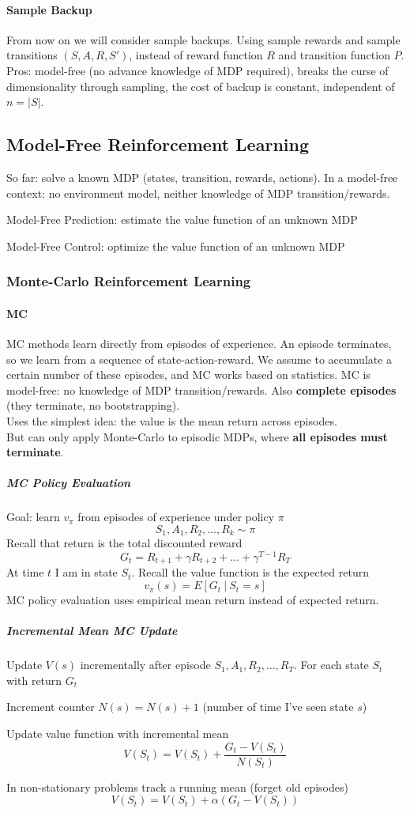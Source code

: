 \documentclass[10pt]{report}
\begin{document}
\paragraph{Sample Backup} From now on we will consider sample backups. Using sample rewards and sample transitions $(S,A,R,S')$, instead of reward function $R$ and transition function $P$.\\
Pros: model-free (no advance knowledge of MDP required), breaks the curse of dimensionality through sampling, the cost of backup is constant, independent of $n = |S|$.
\subsection{Model-Free Reinforcement Learning}
So far: solve a known MDP (states, transition, rewards, actions). In a model-free context: no environment model, neither knowledge of MDP transition/rewards.
\begin{list}{}{}
	\item Model-Free Prediction: estimate the value function of an unknown MDP
	\item Model-Free Control: optimize the value function of an unknown MDP
\end{list}
\subsubsection{Monte-Carlo Reinforcement Learning}
\paragraph{MC} MC methods learn directly from episodes of experience. An episode terminates, so we learn from a sequence of state-action-reward. We assume to accumulate a certain number of these episodes, and MC works based on statistics. MC is model-free: no knowledge of MDP transition/rewards. Also \textbf{complete episodes} (they terminate, no bootstrapping).\\
Uses the simplest idea: the value is the mean return across episodes.\\
But can only apply Monte-Carlo to episodic MDPs, where \textbf{all episodes must terminate}.
\subparagraph{MC Policy Evaluation} Goal: learn $v_\pi$ from episodes of experience under policy $\pi$
$$S_1,A_1,R_2,\ldots,R_k\sim \pi$$
Recall that return is the total discounted reward
$$G_t = R_{t+1} + \gamma R_{t+2} + \ldots + \gamma^{T-1}R_T$$
At time $t$ I am in state $S_t$. Recall the value function is the expected return $$v_\pi(s)=E[G_t\:|\:S_t=s]$$
MC policy evaluation uses empirical mean return instead of expected return.
\subparagraph{Incremental Mean MC Update} Update $V(s)$ incrementally after episode $S_1,A_1,R_2,\ldots, R_T$. For each state $S_t$ with return $G_t$\begin{list}{}{}
	\item Increment counter $N(s) = N(s) + 1$ (number of time I've seen state $s$)
	\item Update value function with incremental mean
	$$V(S_t) = V(S_t) + \frac{G_t - V(S_t)}{N(S_t)}$$
\end{list}
In non-stationary problems track a running mean (forget old episodes)
$$V(S_t) = V(S_t) +\alpha(G_t-V(S_t))$$
\end{document}
